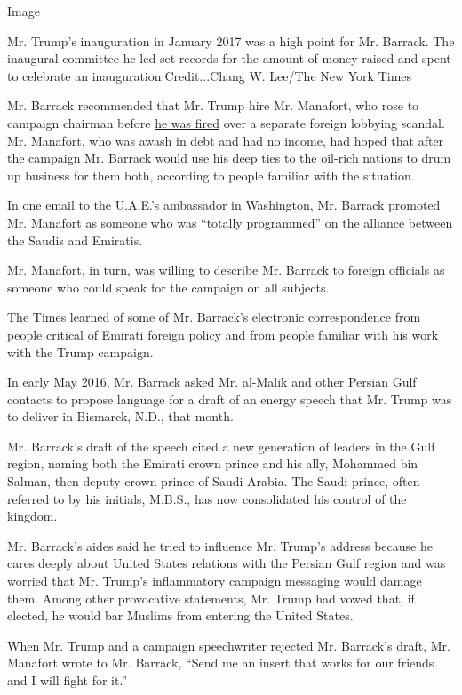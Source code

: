 Image

Mr. Trump's inauguration in January 2017 was a high point for Mr.
Barrack. The inaugural committee he led set records for the amount of
money raised and spent to celebrate an inauguration.Credit...Chang W.
Lee/The New York Times

Mr. Barrack recommended that Mr. Trump hire Mr. Manafort, who rose to
campaign chairman before
\href{https://www.nytimes.com/2016/08/20/us/politics/paul-manafort-resigns-donald-trump.html}{he
was fired} over a separate foreign lobbying scandal. Mr. Manafort, who
was awash in debt and had no income, had hoped that after the campaign
Mr. Barrack would use his deep ties to the oil-rich nations to drum up
business for them both, according to people familiar with the situation.

In one email to the U.A.E.'s ambassador in Washington, Mr. Barrack
promoted Mr. Manafort as someone who was ``totally programmed'' on the
alliance between the Saudis and Emiratis.

Mr. Manafort, in turn, was willing to describe Mr. Barrack to foreign
officials as someone who could speak for the campaign on all subjects.

The Times learned of some of Mr. Barrack's electronic correspondence
from people critical of Emirati foreign policy and from people familiar
with his work with the Trump campaign.

In early May 2016, Mr. Barrack asked Mr. al-Malik and other Persian Gulf
contacts to propose language for a draft of an energy speech that Mr.
Trump was to deliver in Bismarck, N.D., that month.

Mr. Barrack's draft of the speech cited a new generation of leaders in
the Gulf region, naming both the Emirati crown prince and his ally,
Mohammed bin Salman, then deputy crown prince of Saudi Arabia. The Saudi
prince, often referred to by his initials, M.B.S., has now consolidated
his control of the kingdom.

Mr. Barrack's aides said he tried to influence Mr. Trump's address
because he cares deeply about United States relations with the Persian
Gulf region and was worried that Mr. Trump's inflammatory campaign
messaging would damage them. Among other provocative statements, Mr.
Trump had vowed that, if elected, he would bar Muslims from entering the
United States.

When Mr. Trump and a campaign speechwriter rejected Mr. Barrack's draft,
Mr. Manafort wrote to Mr. Barrack, ``Send me an insert that works for
our friends and I will fight for it.''

